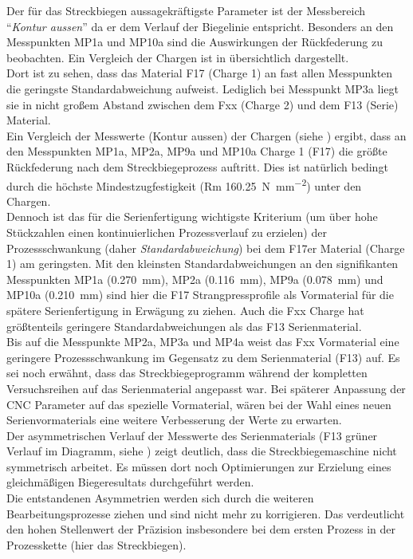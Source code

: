 \documentclass[12pt,a4paper,parskip]{scrartcl}
\begin{document}
Der für das Streckbiegen aussagekräftigste Parameter ist der Messbereich "`\emph{Kontur aussen}"' da er dem Verlauf der Biegelinie entspricht. Besonders an den Messpunkten MP1a und MP10a sind die Auswirkungen der Rückfederung zu beobachten. Ein Vergleich der Chargen ist in  übersichtlich dargestellt. \\Dort ist zu sehen, dass das Material F17 (Charge 1) an fast allen Messpunkten die geringste Standardabweichung aufweist. Lediglich bei Messpunkt MP3a liegt sie in nicht großem Abstand zwischen dem Fxx (Charge 2) und dem F13 (Serie) Material.\\Ein Vergleich der Messwerte (Kontur aussen) der Chargen (siehe  ) ergibt, dass an den Messpunkten MP1a, MP2a, MP9a und MP10a  Charge 1 (F17) die größte Rückfederung nach dem Streckbiegeprozess auftritt. Dies ist natürlich bedingt durch die höchste Mindestzugfestigkeit (Rm \SI{160,25}{\newton\per\milli\meter\squared}) unter den Chargen.\\
 Dennoch ist das für die Serienfertigung wichtigste Kriterium (um über hohe Stückzahlen einen kontinuierlichen Prozessverlauf zu erzielen) der Prozessschwankung (daher \emph{Standardabweichung}) bei dem F17er Material (Charge 1) am geringsten. Mit den kleinsten Standardabweichungen an den signifikanten Messpunkten MP1a (\SI{0,270}{\milli\meter}),  MP2a (\SI{0,116}{\milli\meter}),  MP9a (\SI{0,078}{\milli\meter}) und MP10a (\SI{0,210}{\milli\meter}) sind hier die F17 Strangpressprofile als Vormaterial für die spätere Serienfertigung in Erwägung zu ziehen. Auch die Fxx Charge hat größtenteils geringere Standardabweichungen als das F13 Serienmaterial.\\ Bis auf die Messpunkte MP2a, MP3a und MP4a  weist das Fxx Vormaterial eine geringere Prozessschwankung im Gegensatz zu dem Serienmaterial (F13) auf. Es sei noch erwähnt, dass das Streckbiegeprogramm während der kompletten Versuchsreihen auf das Serienmaterial angepasst war. Bei späterer Anpassung der CNC Parameter auf das spezielle Vormaterial,  wären bei der Wahl eines neuen Serienvormaterials eine weitere Verbesserung der Werte zu erwarten.\\ Der asymmetrischen Verlauf der Messwerte des Serienmaterials (F13 grüner Verlauf im Diagramm,   siehe ) zeigt deutlich, dass die Streckbiegemaschine nicht symmetrisch arbeitet. Es müssen dort noch Optimierungen zur Erzielung eines gleichmäßigen Biegeresultats durchgeführt werden.\\
 Die entstandenen Asymmetrien werden sich durch die weiteren Bearbeitungsprozesse ziehen und sind nicht mehr zu korrigieren. Das verdeutlicht den hohen Stellenwert der Präzision insbesondere bei dem ersten Prozess in der Prozesskette (hier das Streckbiegen).
  
\end{document}
